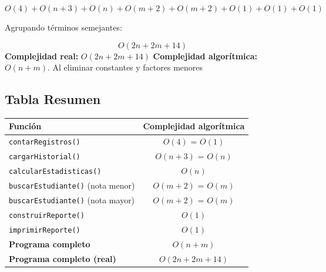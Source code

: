 \documentclass[12pt,letterpaper]{article}
\begin{document}
\[
O(4) + O(n + 3) + O(n) + O(m + 2) + O(m + 2) + O(1) + O(1) + O(1)
\]

Agrupando términos semejantes:

\[
O(2n + 2m + 14)
\]
\newline
\textbf{Complejidad real:} $O(2n + 2m + 14)$
\newline
\textbf{Complejidad algorítmica:} $O(n + m)$. Al eliminar constantes y factores menores

\subsection{Tabla Resumen}

\begin{center}
\begin{tabular}{@{}lc@{}}
\toprule
\textbf{Función} & \textbf{Complejidad algorítmica} \\
\midrule
\texttt{contarRegistros()} & $O(4)$ = $O(1)$ \\
\texttt{cargarHistorial()} & $O(n + 3)$ = $O(n)$ \\
\texttt{calcularEstadisticas()} & $O(n)$ \\
\texttt{buscarEstudiante()} (nota menor) & $O(m + 2)$ = $O(m)$ \\
\texttt{buscarEstudiante()} (nota mayor) & $O(m + 2)$ = $O(m)$ \\
\texttt{construirReporte()} & $O(1)$ \\
\texttt{imprimirReporte()} & $O(1)$ \\
\midrule
\textbf{Programa completo} & $O(n + m)$ \\
\textbf{Programa completo (real)} & $O(2n + 2m + 14)$ \\
\bottomrule
\end{tabular}
\end{center}
\end{document}

